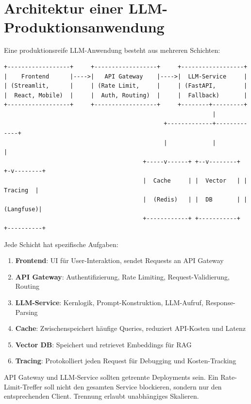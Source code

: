 \section{Architektur einer LLM-Produktionsanwendung}

Eine produktionsreife LLM-Anwendung besteht aus mehreren Schichten:

\begin{verbatim}
+------------------+     +------------------+     +------------------+
|    Frontend      |---->|   API Gateway    |---->|  LLM-Service     |
| (Streamlit,      |     | (Rate Limit,     |     | (FastAPI,        |
|  React, Mobile)  |     |  Auth, Routing)  |     |  Fallback)       |
+------------------+     +------------------+     +--------+---------+
                                                            |
                                              +-------------+-------------+
                                              |             |             |
                                        +-----v------+ +--v--------+ +-v--------+
                                        |  Cache     | |  Vector   | | Tracing  |
                                        |  (Redis)   | |  DB       | |(Langfuse)|
                                        +------------+ +-----------+ +----------+
\end{verbatim}

Jede Schicht hat spezifische Aufgaben:

\begin{enumerate}[leftmargin=*]
    \item \textbf{Frontend}: UI für User-Interaktion, sendet Requests an API Gateway
    \item \textbf{API Gateway}: Authentifizierung, Rate Limiting, Request-Validierung, Routing
    \item \textbf{LLM-Service}: Kernlogik, Prompt-Konstruktion, LLM-Aufruf, Response-Parsing
    \item \textbf{Cache}: Zwischenspeichert häufige Queries, reduziert API-Kosten und Latenz
    \item \textbf{Vector DB}: Speichert und retrievet Embeddings für RAG
    \item \textbf{Tracing}: Protokolliert jeden Request für Debugging und Kosten-Tracking
\end{enumerate}

\begin{praxishinweis}
API Gateway und LLM-Service sollten getrennte Deployments sein. Ein Rate-Limit-Treffer soll nicht den gesamten Service blockieren, sondern nur den entsprechenden Client. Trennung erlaubt unabhängiges Skalieren.
\end{praxishinweis}

